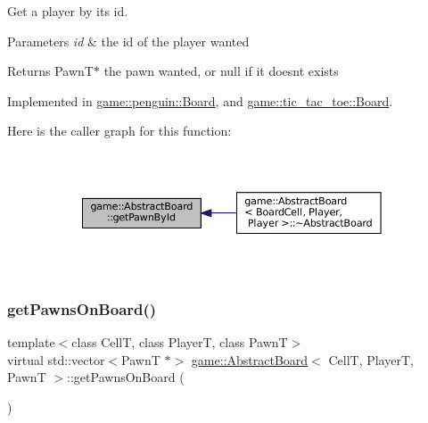 Get a player by it\textquotesingle{}s id. 


\begin{DoxyParams}{Parameters}
{\em id} & the id of the player wanted \\
\hline
\end{DoxyParams}
\begin{DoxyReturn}{Returns}
Pawn\+T$\ast$ the pawn wanted, or null if it doesn\textquotesingle{}t exists 
\end{DoxyReturn}


Implemented in \hyperlink{classgame_1_1penguin_1_1_board_acae84c13dacef3bd988d1ea9a41d055f}{game\+::penguin\+::\+Board}, and \hyperlink{classgame_1_1tic__tac__toe_1_1_board_a7f11ea8d48d9613057dd8164a7610f9a}{game\+::tic\+\_\+tac\+\_\+toe\+::\+Board}.

Here is the caller graph for this function\+:
\nopagebreak
\begin{figure}[H]
\begin{center}
\leavevmode
\includegraphics[width=350pt]{classgame_1_1_abstract_board_a5d80fa5f0809c746349fc1bab1d8999b_icgraph}
\end{center}
\end{figure}
\mbox{\label{classgame_1_1_abstract_board_a9c8a033b23ade01ecce24e95723ffd35}} 
\subsubsection{\texorpdfstring{get\+Pawns\+On\+Board()}{getPawnsOnBoard()}}
{\footnotesize\ttfamily template$<$class CellT, class PlayerT, class PawnT$>$ \\
virtual std\+::vector$<$PawnT $\ast$$>$ \hyperlink{classgame_1_1_abstract_board}{game\+::\+Abstract\+Board}$<$ CellT, PlayerT, PawnT $>$\+::get\+Pawns\+On\+Board (\begin{DoxyParamCaption}{ }\end{DoxyParamCaption})\hspace{0.3cm}{\ttfamily [pure virtual]}}



